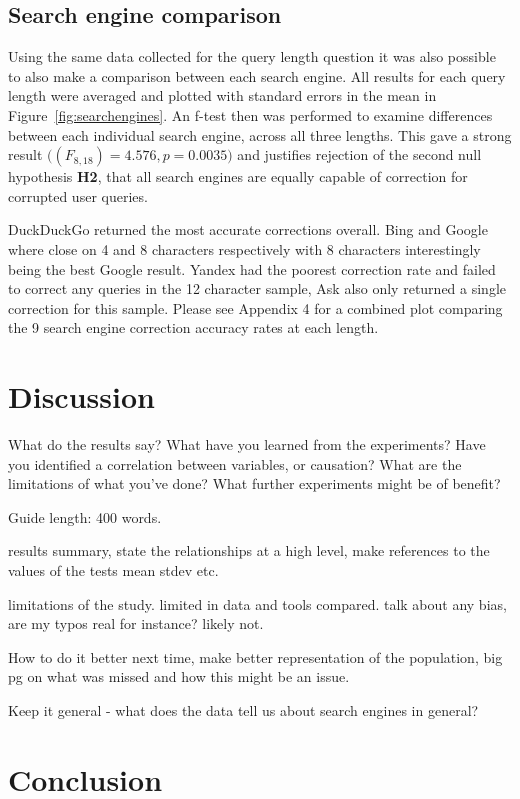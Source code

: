 \documentclass{csfourzero}
\begin{document}
\subsection{Search engine comparison}
Using the same data collected for the query length question it was also possible to also make a comparison between each search engine. All results for each query length were averaged and plotted with standard errors in the mean in Figure~\ref{fig:searchengines}. An f-test then was performed to examine differences between each individual search engine, across all three lengths. This gave a strong result $\big((F_{8,18}) = 4.576, p = 0.0035\big)$ and justifies rejection of the second null hypothesis \textbf{H2}, that all search engines are equally capable of correction for corrupted user queries.

DuckDuckGo returned the most accurate corrections overall. Bing and Google where close on 4 and 8 characters respectively with 8 characters interestingly being the best Google result. Yandex had the poorest correction rate and failed to correct any queries in the 12 character sample, Ask also only returned a single correction for this sample. Please see Appendix 4 for a combined plot comparing the 9 search engine correction accuracy rates at each length.

\section{Discussion}
\label{sec:discuss}

What do the results say? What have you learned from the
experiments? Have you identified a correlation between variables, or
causation? What are the limitations of what you've done? What further
experiments might be of benefit?

Guide length: 400 words.

results summary, state the relationships at a high level, make references to the values of the tests mean stdev etc.

limitations of the study. limited in data and tools compared. talk about any bias, are my typos real for instance? likely not.

How to do it better next time, make better representation of the population, big pg on what was missed and how this might be an issue.

Keep it general - what does the data tell us about search engines in general?

\section{Conclusion}
\label{sec:conc}
\end{document}
